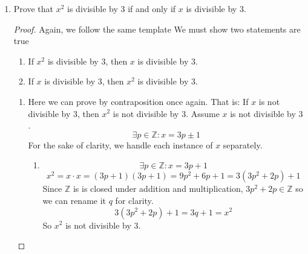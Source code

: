 \documentclass[12pt]{article}
\begin{document}
\begin{enumerate}
\begin{enumerate}
\begin{proof}
                By $i$ and $ii$, we have shown both cases and thus
                $x^2$ is even if and only if $x$ is even. \\

            \end{proof}

        \item Prove that $x^2$ is divisible by $3$ if and only if
              $x$ is divisible by $3$. \\

            \begin{proof}
                Again, we follow the same template
                We must show two statements are true
                \begin{enumerate}
                    \item If $x^2$ is divisible by $3$, then $x$ is divisible by $3$.
                    \item If $x$ is divisible by $3$, then $x^2$ is divisible by $3$.
                \end{enumerate}

                \begin{enumerate}
                    \item
                        Here we can prove by contraposition once again.
                        That is:
                        If $x$ is not divisible by $3$,
                        then $x^2$ is not divisible by $3$.
                        Assume $x$ is not divisible by $3$.
                        \[\exists p \in \mathbb{Z} : x = 3p \pm 1\]
                        For the sake of clarity,
                        we handle each instance of $x$ separately.
                        \begin{enumerate}
                            \item
                                \[\exists p \in \mathbb{Z} : x = 3p + 1\]
                                \[
                                    x^2 = x \cdot x = (3p + 1)(3p + 1) =
                                    9p^2 + 6p + 1 = 3(3p^2 + 2p) + 1
                                \]
                                Since $\mathbb{Z}$ is is closed under
                                addition and multiplication,
                                $3p^2 + 2p \in \mathbb{Z}$ so we can rename it $q$
                                for clarity.
                                \[3(3p^2 + 2p) + 1 = 3q + 1 = x^2\]
                                So $x^2$ is not divisible by $3$.


\end{enumerate}
\end{enumerate}
\end{proof}
\end{enumerate}
\end{enumerate}
\end{document}
